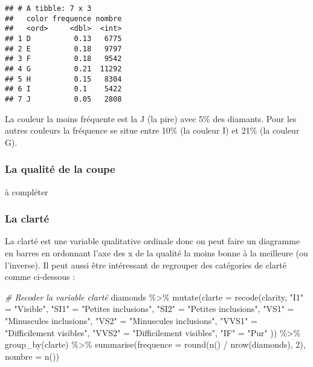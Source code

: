 \documentclass[
]{article}
\newenvironment{Shaded}{\begin{snugshade}}{\end{snugshade}}
\newcommand{\AttributeTok}[1]{\textcolor[rgb]{0.77,0.63,0.00}{#1}}
\newcommand{\CommentTok}[1]{\textcolor[rgb]{0.56,0.35,0.01}{\textit{#1}}}
\newcommand{\DecValTok}[1]{\textcolor[rgb]{0.00,0.00,0.81}{#1}}
\newcommand{\FunctionTok}[1]{\textcolor[rgb]{0.00,0.00,0.00}{#1}}
\newcommand{\NormalTok}[1]{#1}
\newcommand{\OtherTok}[1]{\textcolor[rgb]{0.56,0.35,0.01}{#1}}
\newcommand{\SpecialCharTok}[1]{\textcolor[rgb]{0.00,0.00,0.00}{#1}}
\newcommand{\StringTok}[1]{\textcolor[rgb]{0.31,0.60,0.02}{#1}}
\begin{document}
\begin{verbatim}
## # A tibble: 7 x 3
##   color frequence nombre
##   <ord>     <dbl>  <int>
## 1 D          0.13   6775
## 2 E          0.18   9797
## 3 F          0.18   9542
## 4 G          0.21  11292
## 5 H          0.15   8304
## 6 I          0.1    5422
## 7 J          0.05   2808
\end{verbatim}

La couleur la moins fréquente est la J (la pire) avec 5\% des diamants.
Pour les autres couleurs la fréquence se situe entre 10\% (la couleur I)
et 21\% (la couleur G).

\hypertarget{la-qualituxe9-de-la-coupe}{%
\subsubsection{La qualité de la coupe}\label{la-qualituxe9-de-la-coupe}}

à compléter

\hypertarget{la-clartuxe9}{%
\subsubsection{La clarté}\label{la-clartuxe9}}

La clarté est une variable qualitative ordinale donc on peut faire un
diagramme en barres en ordonnant l'axe des x de la qualité la moins
bonne à la meilleure (ou l'inverse). Il peut aussi être intéressant de
regrouper des catégories de clarté comme ci-dessous :

\begin{Shaded}
\begin{Highlighting}[]
\CommentTok{\# Recoder la variable clarté}
\NormalTok{diamonds }\SpecialCharTok{\%\textgreater{}\%}
  \FunctionTok{mutate}\NormalTok{(}\AttributeTok{clarte =} \FunctionTok{recode}\NormalTok{(clarity,}
    \StringTok{"I1"} \OtherTok{=} \StringTok{"Visible"}\NormalTok{, }\StringTok{"SI1"} \OtherTok{=} \StringTok{"Petites inclusions"}\NormalTok{,}
    \StringTok{"SI2"} \OtherTok{=} \StringTok{"Petites inclusions"}\NormalTok{,}
    \StringTok{"VS1"} \OtherTok{=} \StringTok{"Minuscules inclusions"}\NormalTok{,}
    \StringTok{"VS2"} \OtherTok{=} \StringTok{"Minuscules inclusions"}\NormalTok{,}
    \StringTok{"VVS1"} \OtherTok{=} \StringTok{"Difficilement visibles"}\NormalTok{,}
    \StringTok{"VVS2"} \OtherTok{=} \StringTok{"Difficilement visibles"}\NormalTok{,}
    \StringTok{"IF"} \OtherTok{=} \StringTok{"Pur"}
\NormalTok{  )) }\SpecialCharTok{\%\textgreater{}\%}
  \FunctionTok{group\_by}\NormalTok{(clarte) }\SpecialCharTok{\%\textgreater{}\%}
  \FunctionTok{summarise}\NormalTok{(}\AttributeTok{frequence =} \FunctionTok{round}\NormalTok{(}\FunctionTok{n}\NormalTok{() }\SpecialCharTok{/} \FunctionTok{nrow}\NormalTok{(diamonds), }\DecValTok{2}\NormalTok{), }\AttributeTok{nombre =} \FunctionTok{n}\NormalTok{())}
\end{Highlighting}
\end{Shaded}
\end{document}
